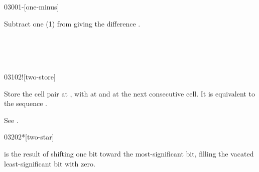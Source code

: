 \vspace*{-1.5ex}
\begin{worddef}{0300}{1-}[one-minus]
\item {}

	Subtract one (1) from  giving the difference
	.

	\begin{testing} %
		 \\
		 \\
		 \\
	\end{testing}
\end{worddef}

\vspace*{-1.5ex}
\begin{worddef}{0310}{2!}[two-store]
\item {}

	Store the cell pair  at , with
	 at  and  at the next
	consecutive cell. It is equivalent to the sequence
	  \word{!}  \word{!}.


	\begin{testing} %
		See .
	\end{testing}
\end{worddef}


\begin{worddef}{0320}{2*}[two-star]
\item {}

	 is the result of shifting  one bit toward
	the most-significant bit, filling the vacated least-significant
	bit with zero.

	\begin{testing} %
		 \\
		 \\
		 \\
		 \\
	\end{testing}
\end{worddef}

